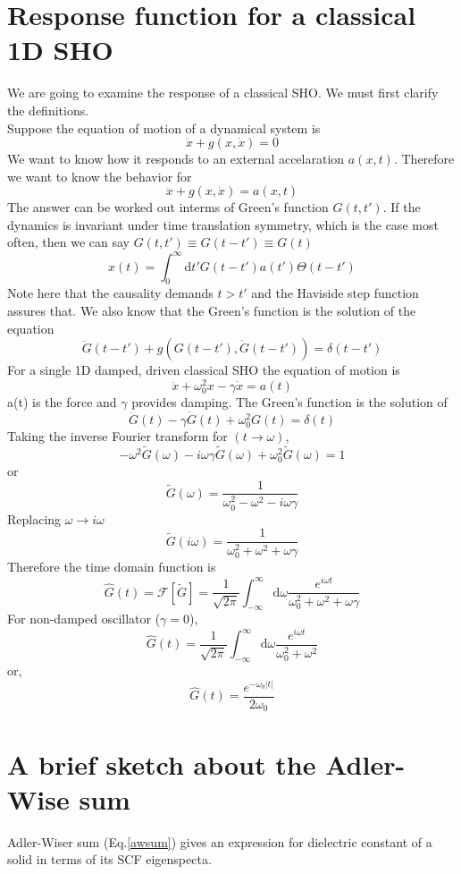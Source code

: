 \documentclass{article}
\newcommand{\eq}{\begin{equation}}
\newcommand{\qe}{\end{equation}}
\newcommand{\diff}{\mathrm{d}}
\newcommand{\abs}[1]{\vert #1\vert}
\begin{document}
\section{Response function for a classical 1D SHO}
We are going to examine the response of a classical SHO. We must first clarify the definitions. \\
Suppose the equation of motion of a dynamical system is 
\eq
\ddot{x}+ g(x, \dot{x})=0
\qe
We want to know how it responds to an external accelaration $a(x,t)$. Therefore we want to know the behavior for 
\eq
\ddot{x}+ g(x, \dot{x})=a(x,t)
\qe
The answer can be worked out interms of Green's function $G(t, t')$. If the dynamics is invariant under time translation symmetry, which is the case most often, then we can say $G(t, t')\equiv G( t-t') \equiv G(t)$
\eq
x(t) = \int_{0}^{\infty}\diff t' G(t-t') a(t')\Theta(t-t')
\qe
Note here that the causality demands $t> t'$ and the Haviside step function assures that. We also know that the Green's function is the solution of the equation
\eq
\ddot{G}(t-t')+ g(G( t-t'), \dot{G}(t-t')) = \delta(t-t')
\qe
For a single 1D damped, driven classical SHO the equation of motion is 
\eq
\ddot{x} + \omega_{0}^{2}x -\gamma \dot{x} = a(t)
\qe
a(t) is the force and $\gamma$ provides damping.  The Green's function is the solution of
\eq
\ddot{G}(t)-\gamma \dot{G}(t)+ \omega_{0}^{2}G(t) = \delta(t)
\qe
Taking the inverse Fourier transform for $(t \to \omega)$, 
\eq
-\omega^2 \tilde{G}(\omega)-i\omega \gamma \tilde{G}(\omega)+ \omega_{0}^{2}\tilde{G}(\omega) = 1
\qe
or
\eq
\tilde{G}(\omega) = \frac{1}{\omega_{0}^{2}-\omega^{2}-i\omega \gamma}
\qe
Replacing $\omega \to i \omega$ 
\eq
\tilde{G}(i\omega) = \frac{1}{\omega_{0}^{2}+\omega^{2}+\omega \gamma}
\qe
Therefore the time domain function is 
\eq
\hat{G}(t) = \mathcal{F}[\tilde{G}] = \frac{1}{\sqrt{2\pi}}\int_{-\infty}^{\infty} \diff \omega \frac{e^{i\omega t}}{\omega_{0}^{2}+\omega^{2}+\omega \gamma}
\qe
For non-damped oscillator ($\gamma =0$),
\eq
\hat{G}(t) = \frac{1}{\sqrt{2\pi}}\int_{-\infty}^{\infty} \diff \omega \frac{e^{i\omega t}}{\omega_{0}^{2}+\omega^{2}}
\qe 
or,
\eq
\hat{G}(t) = \frac{e^{-\omega_{0} \abs{t}}}{2\omega_{0}} 
\qe 
\section{A brief sketch about the Adler-Wise sum}

 Adler-Wiser sum (Eq.\eqref{awsum}) gives an expression for dielectric constant of a solid in terms of its SCF eigenspecta. 
\end{document}
